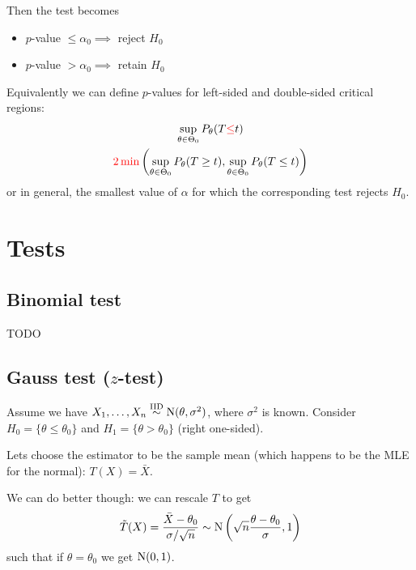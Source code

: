 \documentclass[12pt]{extarticle}
\newcommand{\Normal}{{\operatorfont N}}
\begin{document}
Then the test becomes
\begin{itemize}
	\item $p$-value $\leq \alpha_0 \implies$ reject $H_0$
	\item $p$-value $> \alpha_0 \implies$ retain $H_0$
\end{itemize}

Equivalently we can define $p$-values for left-sided and double-sided critical regions:
\begin{gather}
	\sup_{\theta \in \Theta_0} P_\theta (T {\color{red} \leq} t)\\
	{\color{red} 2 \min }\left( \sup_{\theta \in \Theta_0} P_\theta (T \geq t), \sup_{\theta \in \Theta_0} P_\theta (T \leq t) \right)
\end{gather}
or in general, the smallest value of $\alpha$ for which the corresponding test rejects $H_0$.

\section{Tests}

\subsection{Binomial test}

TODO

\subsection{Gauss test (\texorpdfstring{$z$}{z}-test)}

Assume we have $X_1, \dots, X_n \stackrel{\text{IID}}{\sim} \Normal(\theta, \sigma^2)$, where $\sigma^2$ is known.
Consider $H_0 = \{ \theta \leq \theta_0 \}$ and $H_1 = \{ \theta \gt \theta_0 \}$ (right one-sided).

Lets choose the estimator to be the sample mean (which happens to be the MLE for the normal): $T(X) = \bar X$.

We can do better though: we can rescale $T$ to get
\begin{equation}
	\tilde{T}(X) = \frac{\bar X - \theta_0}{\sigma /\sqrt{n}} \sim \Normal\left(\sqrt{n} \frac{\theta - \theta_0}{\sigma}, 1\right)
\end{equation}
such that if $\theta = \theta_0$ we get $\Normal(0,1)$.
\end{document}
